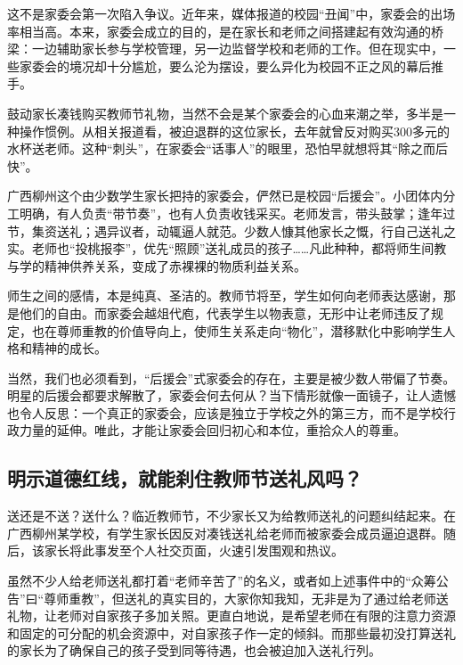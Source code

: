 这不是家委会第一次陷入争议。近年来，媒体报道的校园“丑闻”中，家委会的出场率相当高。本来，家委会成立的目的，是在家长和老师之间搭建起有效沟通的桥梁：一边辅助家长参与学校管理，另一边监督学校和老师的工作。但在现实中，一些家委会的境况却十分尴尬，要么沦为摆设，要么异化为校园不正之风的幕后推手。

鼓动家长凑钱购买教师节礼物，当然不会是某个家委会的心血来潮之举，多半是一种操作惯例。从相关报道看，被迫退群的这位家长，去年就曾反对购买300多元的水杯送老师。这种“刺头”，在家委会“话事人”的眼里，恐怕早就想将其“除之而后快”。

广西柳州这个由少数学生家长把持的家委会，俨然已是校园“后援会”。小团体内分工明确，有人负责“带节奏”，也有人负责收钱采买。老师发言，带头鼓掌；逢年过节，集资送礼；遇异议者，动辄逼人就范。少数人慷其他家长之慨，行自己送礼之实。老师也“投桃报李”，优先“照顾”送礼成员的孩子……凡此种种，都将师生间教与学的精神供养关系，变成了赤裸裸的物质利益关系。

师生之间的感情，本是纯真、圣洁的。教师节将至，学生如何向老师表达感谢，那是他们的自由。而家委会越俎代庖，代表学生以物表意，无形中让老师违反了规定，也在尊师重教的价值导向上，使师生关系走向“物化”，潜移默化中影响学生人格和精神的成长。

当然，我们也必须看到，“后援会”式家委会的存在，主要是被少数人带偏了节奏。明星的后援会都要求解散了，家委会何去何从？当下情形就像一面镜子，让人遗憾也令人反思：一个真正的家委会，应该是独立于学校之外的第三方，而不是学校行政力量的延伸。唯此，才能让家委会回归初心和本位，重拾众人的尊重。


\subsection*{明示道德红线，就能刹住教师节送礼风吗？}

送还是不送？送什么？临近教师节，不少家长又为给教师送礼的问题纠结起来。在广西柳州某学校，有学生家长因反对凑钱送礼给老师而被家委会成员逼迫退群。随后，该家长将此事发至个人社交页面，火速引发围观和热议。

虽然不少人给老师送礼都打着“老师辛苦了”的名义，或者如上述事件中的“众筹公告”曰“尊师重教”，但送礼的真实目的，大家你知我知，无非是为了通过给老师送礼物，让老师对自家孩子多加关照。更直白地说，是希望老师在有限的注意力资源和固定的可分配的机会资源中，对自家孩子作一定的倾斜。而那些最初没打算送礼的家长为了确保自己的孩子受到同等待遇，也会被迫加入送礼行列。

